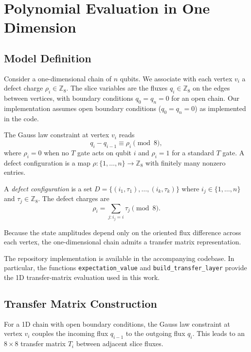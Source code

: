 \section{Polynomial Evaluation in One Dimension}

\subsection{Model Definition}

Consider a one-dimensional chain of $n$ qubits. We associate with each vertex $v_i$ a defect charge $\rho_i \in \mathbb{Z}_8$. The slice variables are the fluxes $q_i \in \mathbb{Z}_8$ on the edges between vertices, with boundary conditions $q_0 = q_n = 0$ for an open chain. Our implementation assumes open boundary conditions ($q_0 = q_n = 0$) as implemented in the code.

The Gauss law constraint at vertex $v_i$ reads
\begin{equation}
q_i - q_{i-1} \equiv \rho_i \pmod{8},
\end{equation}
where $\rho_i = 0$ when no $T$ gate acts on qubit $i$ and $\rho_i = 1$ for a standard $T$ gate. A defect configuration is a map $\rho: \{1,\dots,n\} \to \mathbb{Z}_8$ with finitely many nonzero entries.

\begin{definition}
A \textit{defect configuration} is a set $D = \{(i_1, \tau_1), \dots, (i_k, \tau_k)\}$ where $i_j \in \{1,\dots,n\}$ and $\tau_j \in \mathbb{Z}_8$. The defect charges are
\[
\rho_i = \sum_{j : i_j = i} \tau_j \pmod{8}.
\]
\end{definition}

Because the state amplitudes depend only on the oriented flux difference across each vertex, the one-dimensional chain admits a transfer matrix representation.

The repository implementation is available in the accompanying codebase. In particular, the functions \texttt{expectation\_value} and \texttt{build\_transfer\_layer} provide the 1D transfer-matrix evaluation used in this work.

\subsection{Transfer Matrix Construction}

For a 1D chain with open boundary conditions, the Gauss law constraint at vertex $v_i$ couples the incoming flux $q_{i-1}$ to the outgoing flux $q_i$. This leads to an $8\times 8$ transfer matrix $T_i$ between adjacent slice fluxes.


